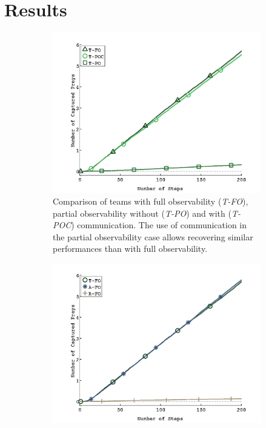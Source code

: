 \section{Results}
\label{sec:results}

\begin{figure}[t]
  \centering
  \begin{subfigure}[t]{0.245\textwidth}
    \centering
    \captionsetup{width=0.95\textwidth}
    \includegraphics[trim=2.6cm 0.4cm 2.7cm 1.8cm, clip=true, width=\figwidth\textwidth]{plots/with_noise/teamComparaison.png}
    \caption{Comparison of teams with full observability (\emph{T-FO}), partial observability without (\emph{T-PO}) and with (\emph{T-POC}) communication. The use of communication in the partial observability case allows recovering similar performances than with full observability. %
}
    \label{fig:cmpteam}
  \end{subfigure}
  \begin{subfigure}[t]{0.245\textwidth}
    \centering
    \captionsetup{width=0.9\textwidth}
    \includegraphics[trim=2.6cm 0.4cm 2.7cm 1.8cm, clip=true, width=\figwidth\textwidth]{plots/with_noise/fullObs.png}

\end{subfigure}
\end{figure}

